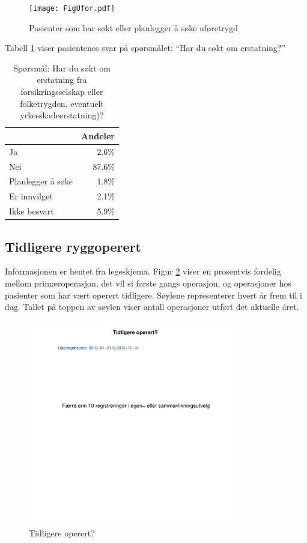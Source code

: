 \documentclass [norsk,a4paper,twoside]{article}\usepackage[]{graphicx}\usepackage[]{color}
\begin{document}
\begin{figure}[ht]
	\centering \texttt{[image: FigUfor.pdf]}
	\caption{\label{fig:Ufor} Pasienter som har søkt eller planlegger å søke uføretrygd} 
\end{figure}

Tabell \ref{tab:Erst} viser pasientenes svar på spørsmålet: ``Har du søkt om erstatning?'' 

\begin{table}[ht]
\centering
\begin{tabular}{lr}
  \hline
 & Andeler \\ 
  \hline
Ja & 2.6\% \\ 
  Nei & 87.6\% \\ 
  Planlegger å søke & 1.8\% \\ 
  Er innvilget & 2.1\% \\ 
  Ikke besvart & 5.9\% \\ 
   \hline
\end{tabular}
\caption{Spørsmål: Har du søkt om erstatning fra forsikringsselskap eller folketrygden, 
		eventuelt yrkesskadeerstatning)?} 
\label{tab:Erst}
\end{table}



\subsection{Tidligere ryggoperert}
Informasjonen er hentet fra legeskjema.
Figur \ref{fig:TidlOp} viser en prosentvis fordelig mellom primæroperasjon, det vil si første gangs 
operasjon, og operasjoner hos pasienter som har vært operert tidligere.  
Søylene representerer hvert år frem til i dag. Tallet på toppen av søylen viser antall operasjoner utført 
det aktuelle året.



\begin{figure}[ht]
	\centering \includegraphics[width= 0.8\textwidth]{TidlOp.pdf}
	\caption{\label{fig:TidlOp} Tidligere operert? }
\end{figure}
\end{document}
